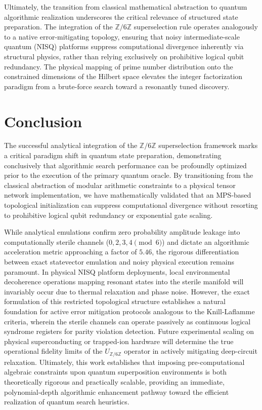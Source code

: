 \documentclass[pdflatex,sn-nature]{sn-jnl}
\theoremstyle{thmstyleone}
\theoremstyle{thmstyletwo}
\theoremstyle{thmstylethree}
\begin{document}
Ultimately, the transition from classical mathematical abstraction to quantum algorithmic realization underscores the critical relevance of structured state preparation. The integration of the $\mathbb{Z}/6\mathbb{Z}$ superselection rule operates analogously to a native error-mitigating topology, ensuring that noisy intermediate-scale quantum (NISQ) platforms suppress computational divergence inherently via structural physics, rather than relying exclusively on prohibitive logical qubit redundancy. The physical mapping of prime number distribution onto the constrained dimensions of the Hilbert space elevates the integer factorization paradigm from a brute-force search toward a resonantly tuned discovery.

\section*{Conclusion}
The successful analytical integration of the $\mathbb{Z}/6\mathbb{Z}$ superselection framework marks a critical paradigm shift in quantum state preparation, demonstrating conclusively that algorithmic search performance can be profoundly optimized prior to the execution of the primary quantum oracle. By transitioning from the classical abstraction of modular arithmetic constraints to a physical tensor network implementation, we have mathematically validated that an MPS-based topological initialization can suppress computational divergence without resorting to prohibitive logical qubit redundancy or exponential gate scaling. 

While analytical emulations confirm zero probability amplitude leakage into computationally sterile channels ($0, 2, 3, 4 \pmod 6$) and dictate an algorithmic acceleration metric approaching a factor of $5.46$, the rigorous differentiation between exact statevector emulation and noisy physical execution remains paramount. In physical NISQ platform deployments, local environmental decoherence operations mapping resonant states into the sterile manifold will invariably occur due to thermal relaxation and phase noise. However, the exact formulation of this restricted topological structure establishes a natural foundation for active error mitigation protocols analogous to the Knill-Laflamme criteria, wherein the sterile channels can operate passively as continuous logical syndrome registers for parity violation detection. Future experimental scaling on physical superconducting or trapped-ion hardware will determine the true operational fidelity limits of the $U_{\mathbb{Z}/6\mathbb{Z}}$ operator in actively mitigating deep-circuit relaxation. Ultimately, this work establishes that imposing pre-computational algebraic constraints upon quantum superposition environments is both theoretically rigorous and practically scalable, providing an immediate, polynomial-depth algorithmic enhancement pathway toward the efficient realization of quantum search heuristics.
\end{document}
